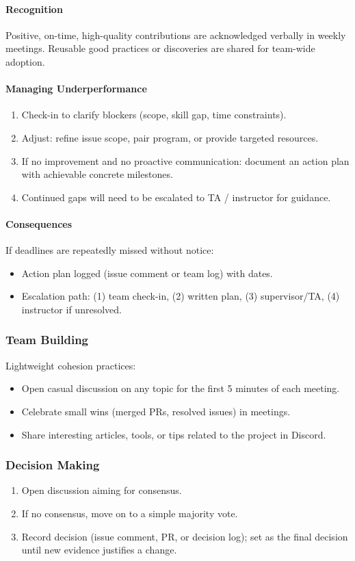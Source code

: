 \documentclass{article}
\begin{document}
\paragraph{Recognition}
Positive, on-time, high-quality contributions are acknowledged verbally in weekly meetings. Reusable good practices or discoveries are shared for team-wide adoption.

\paragraph{Managing Underperformance}
\begin{enumerate}
  \item Check-in to clarify blockers (scope, skill gap, time constraints).
  \item Adjust: refine issue scope, pair program, or provide targeted resources.
  \item If no improvement and no proactive communication: document an action plan with achievable concrete milestones.
  \item Continued gaps will need to be escalated to TA / instructor for guidance.
\end{enumerate}

\paragraph{Consequences}
If deadlines are repeatedly missed without notice:
\begin{itemize}
  \item Action plan logged (issue comment or team log) with dates.
  \item Escalation path: (1) team check-in, (2) written plan, (3) supervisor/TA, (4) instructor if unresolved.
\end{itemize}

\subsubsection*{Team Building}
Lightweight cohesion practices:
\begin{itemize}
  \item Open casual discussion on any topic for the first 5 minutes of each meeting.
  \item Celebrate small wins (merged PRs, resolved issues) in meetings.
  \item Share interesting articles, tools, or tips related to the project in Discord.
\end{itemize}


\subsubsection*{Decision Making}
\begin{enumerate}
  \item Open discussion aiming for consensus.
  \item If no consensus, move on to a simple majority vote.
  \item Record decision (issue comment, PR, or decision log); set as the final decision until new evidence justifies a change.
\end{enumerate}
\end{document}
